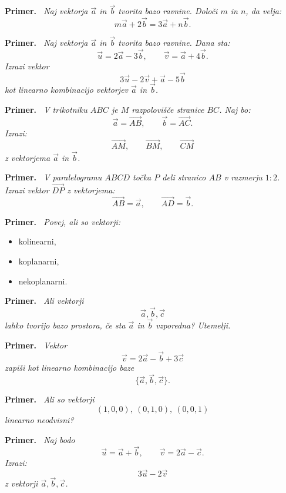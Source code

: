 \documentclass[a4paper,11pt]{article}
\newenvironment{primer}{%
  \par\medskip\noindent\textbf{Primer.}\itshape\ }{\par\medskip}
\begin{document}
\begin{primer}
    Naj vektorja $\vec{a}$ in $\vec{b}$ tvorita bazo ravnine. Določi $m$ in $n$, da velja:
    \[    m\vec{a}+2\vec{b}=3\vec{a}+n\vec{b}.    \]
\end{primer}
\begin{primer}
    Naj vektorja $\vec{a}$ in $\vec{b}$ tvorita bazo ravnine. Dana sta:
    \[    \vec{u}=2\vec{a}-3\vec{b},    \qquad    \vec{v}=\vec{a}+4\vec{b}.    \]
    Izrazi vektor
    \[    3\vec{u}-2\vec{v}+\vec{a}-5\vec{b}    \]
    kot linearno kombinacijo vektorjev $\vec{a}$ in $\vec{b}$.
\end{primer}
\begin{primer}
    V trikotniku $ABC$ je $M$ razpolovišče stranice $BC$.
    Naj bo:
    \[    \vec{a}=\vec{AB}, \qquad \vec{b}=\vec{AC}.    \]
    Izrazi:
    \[    \vec{AM}, \qquad \vec{BM}, \qquad \vec{CM}    \]
    z vektorjema $\vec{a}$ in $\vec{b}$.
\end{primer}
\begin{primer}
    V paralelogramu $ABCD$ točka $P$ deli stranico $AB$ v razmerju $1:2$.
    Izrazi vektor $\vec{DP}$ z vektorjema:
    \[    \vec{AB}=\vec{a}, \qquad \vec{AD}=\vec{b}.    \]
\end{primer}
\begin{primer}
    Povej, ali so vektorji:
    \begin{itemize}
        \item kolinearni,
        \item koplanarni,
        \item nekoplanarni.
    \end{itemize}
\end{primer}

\begin{primer}
Ali vektorji
\[ \vec{a}, \vec{b}, \vec{c} \]
lahko tvorijo bazo prostora, če sta $\vec{a}$ in $\vec{b}$ vzporedna? Utemelji.
\end{primer}

\begin{primer}
Vektor
\[ \vec{v}=2\vec{a}-\vec{b}+3\vec{c} \]
zapiši kot linearno kombinacijo baze
\[ \{\vec{a},\vec{b},\vec{c}\}. \]
\end{primer}

\begin{primer}
Ali so vektorji
\[ (1,0,0),\ (0,1,0),\ (0,0,1) \]
linearno neodvisni?
\end{primer}

\begin{primer}
Naj bodo
\[ \vec{u}=\vec{a}+\vec{b}, \qquad \vec{v}=2\vec{a}-\vec{c}. \]
Izrazi:
\[ 3\vec{u}-2\vec{v} \] z vektorji $\vec{a},\vec{b},\vec{c}$.
\end{primer}
\end{document}
